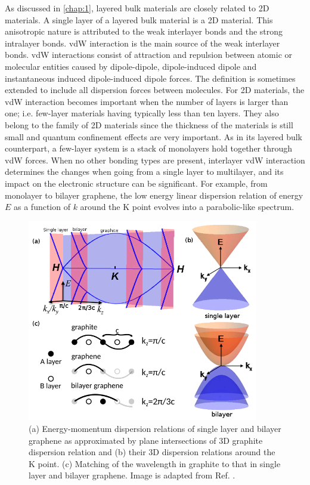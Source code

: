 As discussed in \autoref{chap:1}, layered bulk materials are closely related to 2D materials. A single layer of a layered bulk material is a 2D material. This anisotropic nature is attributed to the weak interlayer bonds and the strong intralayer bonds. vdW interaction \cite{vdws} is the main source of the weak interlayer bonds. vdW interactions consist of attraction and repulsion between atomic or molecular entities caused by dipole-dipole, dipole-induced dipole and instantaneous induced dipole-induced dipole forces. The definition is sometimes extended to include all dispersion forces between molecules.  For 2D materials, the vdW interaction becomes important when the number of layers is larger than one; i.e. few-layer materials having typically less than ten layers. They also belong to the family of 2D materials since the thickness of the materials is still small and quantum confinement effects are very important. As in its layered bulk counterpart, a few-layer system is a stack of monolayers hold together through vdW forces. When no other bonding types are present, interlayer vdW interaction determines the changes when going from a single layer to multilayer, and its impact on the electronic structure can be significant. For example, from monolayer to bilayer graphene, the low energy linear dispersion relation of energy $E$ as a function of $k$ around the $\mathrm{K}$ point evolves into a parabolic-like spectrum\cite{Partoens2006,Mak2010a}. 

\begin{figure}[ht] 
\centering  
\includegraphics[width=0.9\textwidth]{gra_band.png}
\caption[Energy-momentum dispersion of graphene from graphite]{(a) Energy-momentum dispersion relations of single layer and bilayer graphene as approximated by plane intersections of 3D graphite dispersion relation and (b) their 3D dispersion relations around the $\mathrm{K}$ point. (c) Matching of the wavelength in graphite to that in single layer and bilayer graphene. Image is adapted from Ref. \cite{Mak2010a}. }  
\label{fig:gra_bands}
\end{figure} 

